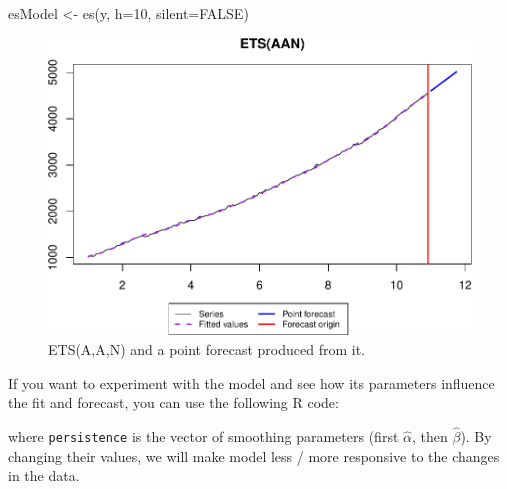 \documentclass[
]{book}
\newenvironment{Shaded}{\begin{snugshade}}{\end{snugshade}}
\newcommand{\AttributeTok}[1]{\textcolor[rgb]{0.77,0.63,0.00}{#1}}
\newcommand{\ConstantTok}[1]{\textcolor[rgb]{0.00,0.00,0.00}{#1}}
\newcommand{\DecValTok}[1]{\textcolor[rgb]{0.00,0.00,0.81}{#1}}
\newcommand{\FloatTok}[1]{\textcolor[rgb]{0.00,0.00,0.81}{#1}}
\newcommand{\FunctionTok}[1]{\textcolor[rgb]{0.00,0.00,0.00}{#1}}
\newcommand{\NormalTok}[1]{#1}
\newcommand{\OtherTok}[1]{\textcolor[rgb]{0.56,0.35,0.01}{#1}}
\newcommand{\SpecialCharTok}[1]{\textcolor[rgb]{0.00,0.00,0.00}{#1}}
\theoremstyle{definition}
\theoremstyle{definition}
\theoremstyle{definition}
\theoremstyle{definition}
\theoremstyle{remark}
\begin{document}
\begin{Shaded}
\begin{Highlighting}[]
\NormalTok{esModel }\OtherTok{\textless{}{-}} \FunctionTok{es}\NormalTok{(y, }\AttributeTok{h=}\DecValTok{10}\NormalTok{, }\AttributeTok{silent=}\ConstantTok{FALSE}\NormalTok{)}
\end{Highlighting}
\end{Shaded}

\begin{figure}
\centering
\includegraphics{adam_files/figure-latex/ETSAANExampleForecast-1.pdf}
\caption{\label{fig:ETSAANExampleForecast}ETS(A,A,N) and a point forecast produced from it.}
\end{figure}

If you want to experiment with the model and see how its parameters influence the fit and forecast, you can use the following R code:

\begin{Shaded}
\end{Shaded}

where \texttt{persistence} is the vector of smoothing parameters (first \(\hat\alpha\), then \(\hat\beta\)). By changing their values, we will make model less / more responsive to the changes in the data.
\end{document}
